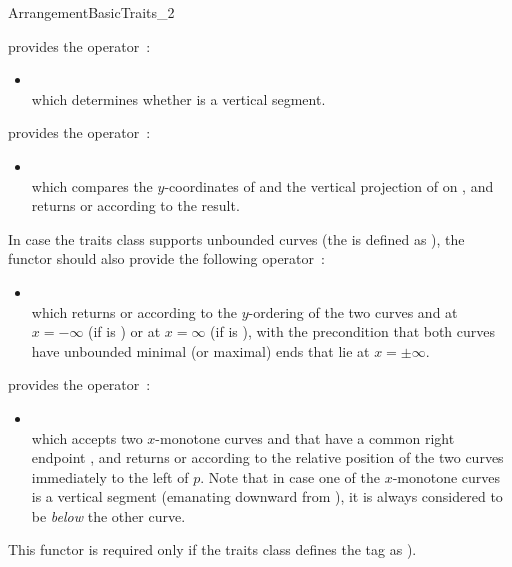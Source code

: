 \begin{ccRefConcept}{ArrangementBasicTraits_2}
{provides the operator~:
 \begin{itemize}
 \item {} \\
 which determines whether  is a vertical segment.
 \end{itemize}}

{provides the operator~:
 \begin{itemize}
 \item {} \\
 which compares the $y$-coordinates of  and the vertical projection
 of  on , and returns  or 
 according to the result.
 \end{itemize}
 In case the traits class supports unbounded curves (the
  is defined as ), the functor
 should also provide the following operator~:
 \begin{itemize}
 \item {} \\
 which returns  or  according to the
 $y$-ordering of the two curves  and  at $x = -\infty$
 (if  is ) or at $x = \infty$ (if  is 
 ), with the precondition that both curves have unbounded
 minimal (or maximal) ends that lie at $x = \pm\infty$.
 \end{itemize}}

{provides the operator~:
 \begin{itemize}
 \item {} \\
 which accepts two $x$-monotone curves  and  that have
 a common right endpoint , and returns  or
  according to the relative position of the two curves
 immediately to the left of $p$. Note that in case one of the $x$-monotone
 curves is a vertical segment (emanating downward from ), it is always
 considered to be {\sl below} the other curve.
 \end{itemize}
 This functor is required only if the traits class defines the
  tag as ).}


\end{ccRefConcept}
